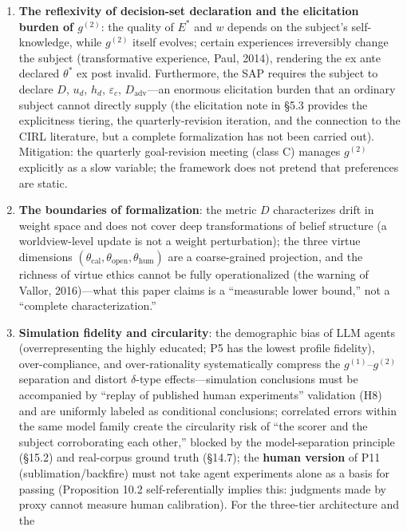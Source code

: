 \documentclass[
  11pt]{article}
\begin{document}
\begin{enumerate}
\item
  \textbf{The reflexivity of decision-set declaration and the
  elicitation burden of \(g^{(2)}\)}: the quality of \(E^*\) and \(w\)
  depends on the subject's self-knowledge, while \(g^{(2)}\) itself
  evolves; certain experiences irreversibly change the subject
  (transformative experience, Paul, 2014), rendering the ex ante
  declared \(\theta^*\) ex post invalid. Furthermore, the SAP requires
  the subject to declare \(D\), \(u_d\), \(h_d\), \(\varepsilon_c\),
  \(D_{\mathrm{adv}}\)---an enormous elicitation burden that an ordinary
  subject cannot directly supply (the elicitation note in §5.3 provides
  the explicitness tiering, the quarterly-revision iteration, and the
  connection to the CIRL literature, but a complete formalization has
  not been carried out). Mitigation: the quarterly goal-revision meeting
  (class C) manages \(g^{(2)}\) explicitly as a slow variable; the
  framework does not pretend that preferences are static.
\item
  \textbf{The boundaries of formalization}: the metric \(D\)
  characterizes drift in weight space and does not cover deep
  transformations of belief structure (a worldview-level update is not a
  weight perturbation); the three virtue dimensions
  \((\theta_{\mathrm{cal}}, \theta_{\mathrm{open}}, \theta_{\mathrm{hum}})\)
  are a coarse-grained projection, and the richness of virtue ethics
  cannot be fully operationalized (the warning of Vallor, 2016)---what
  this paper claims is a ``measurable lower bound,'' not a ``complete
  characterization.''
\item
  \textbf{Simulation fidelity and circularity}: the demographic bias of
  LLM agents (overrepresenting the highly educated; P5 has the lowest
  profile fidelity), over-compliance, and over-rationality
  systematically compress the \(g^{(1)}\)--\(g^{(2)}\) separation and
  distort \(\delta\)-type effects---simulation conclusions must be
  accompanied by ``replay of published human experiments'' validation
  (H8) and are uniformly labeled as conditional conclusions; correlated
  errors within the same model family create the circularity risk of
  ``the scorer and the subject corroborating each other,'' blocked by
  the model-separation principle (§15.2) and real-corpus ground truth
  (§14.7); the \textbf{human version} of P11 (sublimation/backfire) must
  not take agent experiments alone as a basis for passing (Proposition
  10.2 self-referentially implies this: judgments made by proxy cannot
  measure human calibration). For the three-tier architecture and the

\end{enumerate}
\end{document}
